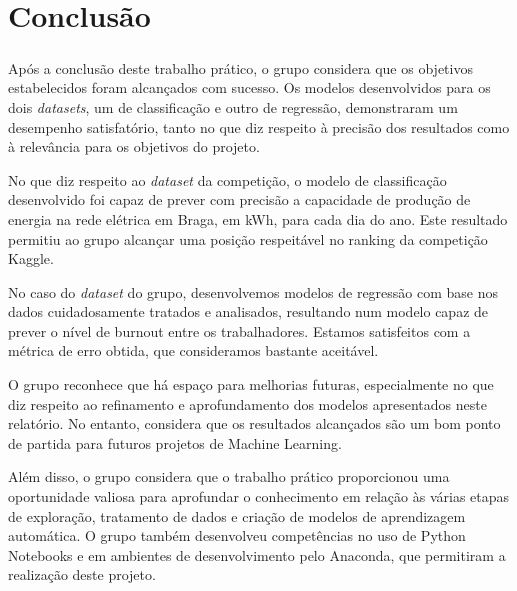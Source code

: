 \chapter{Conclusão}
\paragraph{}
Após a conclusão deste trabalho prático, o grupo considera que os objetivos estabelecidos foram alcançados com sucesso. Os modelos desenvolvidos para os dois \textit{datasets}, um de classificação e outro de regressão, demonstraram um desempenho satisfatório, tanto no que diz respeito à precisão dos resultados como à relevância para os objetivos do projeto.

No que diz respeito ao \textit{dataset} da competição, o modelo de classificação desenvolvido foi capaz de prever com precisão a capacidade de produção de energia na rede elétrica em Braga, em kWh, para cada dia do ano. Este resultado permitiu ao grupo alcançar uma posição respeitável no ranking da competição Kaggle.

No caso do \textit{dataset} do grupo, desenvolvemos modelos de regressão com base nos dados cuidadosamente tratados e analisados, resultando num modelo capaz de prever o nível de burnout entre os trabalhadores. Estamos satisfeitos com a métrica de erro obtida, que consideramos bastante aceitável.

O grupo reconhece que há espaço para melhorias futuras, especialmente no que diz respeito ao refinamento e aprofundamento dos modelos apresentados neste relatório. No entanto, considera que os resultados alcançados são um bom ponto de partida para futuros projetos de Machine Learning.

Além disso, o grupo considera que o trabalho prático proporcionou uma oportunidade valiosa para aprofundar o conhecimento em relação às várias etapas de exploração, tratamento de dados e criação de modelos de aprendizagem automática. O grupo também desenvolveu competências no uso de Python Notebooks e em ambientes de desenvolvimento pelo Anaconda, que permitiram a realização deste projeto.
